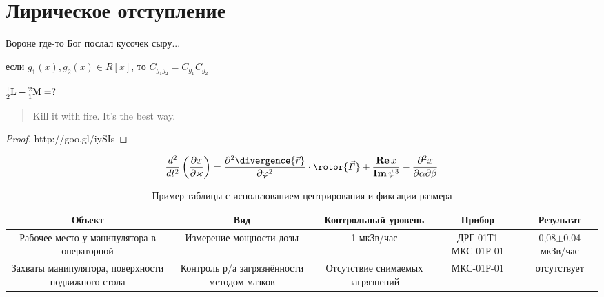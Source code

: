 \documentclass[pscyr,titlepage]{hedreport}
\begin{document}
	\section{Лирическое отступление}
	\begin{proposition}
		Вороне где-то Бог послал кусочек сыру...
	\end{proposition}
	\begin{comment}
		наверное TCP/IP пакетом
	\end{comment}
	\begin{lemma}
		если \( g_1(x), g_2(x) \in R[x] \),
		то \( C_{g_1g_2} = C_{g_1} C_{g_2} \)
	\end{lemma}
	\begin{solution}
		\( \nucleus{1}{2}{L} - \nucleus{2}{1}{M} = ? \)
	\end{solution}
	
	\begin{quotation}
		Kill it with fire. It's the best way.
	\end{quotation}
	
	\begin{proof}
		http://goo.gl/iySIs
	\end{proof}
	\[
		\dder{}{t}\left( \pder{x}{\kappa} \right) =
			\ppder{\divergence{\vec{r}}}{\phi}\cdot\rotor{\vec\Gamma} +
			\frac{\Re{x}}{\Im{\psi^3}} - \pcder{x}{\alpha}{\beta}
	\]
	\begin{table}[ht]
		\centering
		\caption{Пример таблицы с использованием центрирования
			и фиксации размера}
		\begin{tabular}{|C{.2}|C{.2}|C{.17}|C{.18}|C{.15}|}
			\hline
			Объект & Вид & Контрольный уровень & Прибор & Результат \\ \hline
			Рабочее место у манипулятора в операторной
			& Измерение мощности дозы
			& 1 мкЗв/час & ДРГ-01Т1 МКС-01Р-01
			& 0,08\( \pm \)0,04 мкЗв/час \\ \hline
			Захваты манипулятора, поверхности подвижного стола
			& Контроль р/а загрязнённости методом мазков
			& Отсутствие снимаемых загрязнений
			& МКС-01Р-01 & отсутствует \\ \hline
		\end{tabular}
	\end{table}
\end{document}
